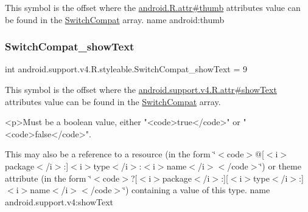 This symbol is the offset where the \hyperlink{}{android.\+R.\+attr\#thumb} attribute\textquotesingle{}s value can be found in the \hyperlink{classandroid_1_1support_1_1v4_1_1R_1_1styleable_a3b46a9ea84acdcc1d9e88a54fc6f685e}{Switch\+Compat} array.  name android\+:thumb \mbox{\label{classandroid_1_1support_1_1v4_1_1R_1_1styleable_afd7664e77fd28cb758f94f37079b87bf}} 
\subsubsection{\texorpdfstring{Switch\+Compat\+\_\+show\+Text}{SwitchCompat\_showText}}
{\footnotesize\ttfamily int android.\+support.\+v4.\+R.\+styleable.\+Switch\+Compat\+\_\+show\+Text = 9\hspace{0.3cm}{\ttfamily [static]}}

This symbol is the offset where the \hyperlink{classandroid_1_1support_1_1v4_1_1R_1_1attr_aa0095b9dde80a1ef23701d9b393c5343}{android.\+support.\+v4.\+R.\+attr\#show\+Text} attribute\textquotesingle{}s value can be found in the \hyperlink{classandroid_1_1support_1_1v4_1_1R_1_1styleable_a3b46a9ea84acdcc1d9e88a54fc6f685e}{Switch\+Compat} array.

\begin{DoxyVerb}      <p>Must be a boolean value, either "<code>true</code>" or "<code>false</code>".
\end{DoxyVerb}
 

This may also be a reference to a resource (in the form \char`\"{}$<$code$>$@\mbox{[}$<$i$>$package$<$/i$>$\+:\mbox{]}$<$i$>$type$<$/i$>$\+:$<$i$>$name$<$/i$>$$<$/code$>$\char`\"{}) or theme attribute (in the form \char`\"{}$<$code$>$?\mbox{[}$<$i$>$package$<$/i$>$\+:\mbox{]}\mbox{[}$<$i$>$type$<$/i$>$\+:\mbox{]}$<$i$>$name$<$/i$>$$<$/code$>$\char`\"{}) containing a value of this type.  name android.\+support.\+v4\+:show\+Text \mbox{\label{classandroid_1_1support_1_1v4_1_1R_1_1styleable_ac1b201bc3080cd31d6a4579fb95a0af7}} 
